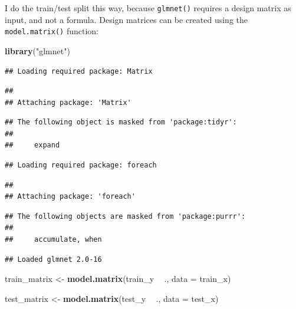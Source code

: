 \documentclass[]{gitbook}
\newenvironment{Shaded}{\begin{snugshade}}{\end{snugshade}}
\newcommand{\DataTypeTok}[1]{\textcolor[rgb]{0.13,0.29,0.53}{#1}}
\newcommand{\KeywordTok}[1]{\textcolor[rgb]{0.13,0.29,0.53}{\textbf{#1}}}
\newcommand{\NormalTok}[1]{#1}
\newcommand{\OperatorTok}[1]{\textcolor[rgb]{0.81,0.36,0.00}{\textbf{#1}}}
\newcommand{\StringTok}[1]{\textcolor[rgb]{0.31,0.60,0.02}{#1}}
\theoremstyle{definition}
\theoremstyle{definition}
\theoremstyle{definition}
\theoremstyle{remark}
\begin{document}
I do the train/test split this way, because \texttt{glmnet()} requires a
design matrix as input, and not a formula. Design matrices can be
created using the \texttt{model.matrix()} function:

\begin{Shaded}
\begin{Highlighting}[]
\KeywordTok{library}\NormalTok{(}\StringTok{"glmnet"}\NormalTok{)}
\end{Highlighting}
\end{Shaded}

\begin{verbatim}
## Loading required package: Matrix
\end{verbatim}

\begin{verbatim}
## 
## Attaching package: 'Matrix'
\end{verbatim}

\begin{verbatim}
## The following object is masked from 'package:tidyr':
## 
##     expand
\end{verbatim}

\begin{verbatim}
## Loading required package: foreach
\end{verbatim}

\begin{verbatim}
## 
## Attaching package: 'foreach'
\end{verbatim}

\begin{verbatim}
## The following objects are masked from 'package:purrr':
## 
##     accumulate, when
\end{verbatim}

\begin{verbatim}
## Loaded glmnet 2.0-16
\end{verbatim}

\begin{Shaded}
\begin{Highlighting}[]
\NormalTok{train_matrix <-}\StringTok{ }\KeywordTok{model.matrix}\NormalTok{(train_y }\OperatorTok{~}\StringTok{ }\NormalTok{., }\DataTypeTok{data =}\NormalTok{ train_x)}

\NormalTok{test_matrix <-}\StringTok{ }\KeywordTok{model.matrix}\NormalTok{(test_y }\OperatorTok{~}\StringTok{ }\NormalTok{., }\DataTypeTok{data =}\NormalTok{ test_x)}
\end{Highlighting}
\end{Shaded}
\end{document}
